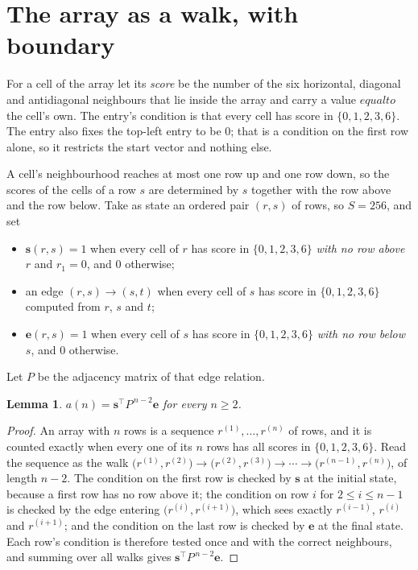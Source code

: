 \documentclass[11pt,a4paper]{article}
\theoremstyle{plain}
\newtheorem{lemma}[theorem]{Lemma}
\theoremstyle{definition}
\begin{document}
\section{The array as a walk, with boundary}

For a cell of the array let its \emph{score} be the number of the six horizontal, diagonal and antidiagonal neighbours that lie inside
the array and carry a value $equal to$ the cell's own. The entry's condition is that every cell
has score in $\{0,1,2,3,6\}$. The entry also fixes the top-left entry to be $0$; that is a condition on the first row alone, so it restricts the start vector and nothing else.

A cell's neighbourhood reaches at most one row up and one row down, so the scores of the
cells of a row $s$ are determined by $s$ together with the row above and the row below.
Take as state an ordered pair $(r,s)$ of rows, so $S=256$, and set
\begin{itemize}
\item $\mathbf{s}(r,s)=1$ when every cell of $r$ has score in $\{0,1,2,3,6\}$ \emph{with no row
above $r$} and $r_1=0$, and $0$ otherwise;
\item an edge $(r,s)\to(s,t)$ when every cell of $s$ has score in $\{0,1,2,3,6\}$ computed from
$r$, $s$ and $t$;
\item $\mathbf{e}(r,s)=1$ when every cell of $s$ has score in $\{0,1,2,3,6\}$ \emph{with no row
below $s$}, and $0$ otherwise.
\end{itemize}
Let $P$ be the adjacency matrix of that edge relation.

\begin{lemma}\label{lem:walk}
$a(n)=\mathbf{s}^{\!\top}P^{\,n-2}\mathbf{e}$ for every $n\ge2$.
\end{lemma}

\begin{proof}
An array with $n$ rows is a sequence $r^{(1)},\dots,r^{(n)}$ of rows, and it is counted
exactly when every one of its $n$ rows has all scores in $\{0,1,2,3,6\}$. Read the sequence as the
walk $\bigl(r^{(1)},r^{(2)}\bigr)\to\bigl(r^{(2)},r^{(3)}\bigr)\to\cdots\to
\bigl(r^{(n-1)},r^{(n)}\bigr)$, of length $n-2$. The condition on the first row is
checked by $\mathbf{s}$ at the initial state, because a first row has no row above it; the
condition on row $i$ for $2\le i\le n-1$ is checked by the edge entering
$\bigl(r^{(i)},r^{(i+1)}\bigr)$, which sees exactly $r^{(i-1)}$, $r^{(i)}$ and
$r^{(i+1)}$; and the condition on the last row is checked by $\mathbf{e}$ at the final
state. Each row's condition is therefore tested once and with the correct neighbours, and
summing over all walks gives $\mathbf{s}^{\!\top}P^{\,n-2}\mathbf{e}$.
\end{proof}
\end{document}
